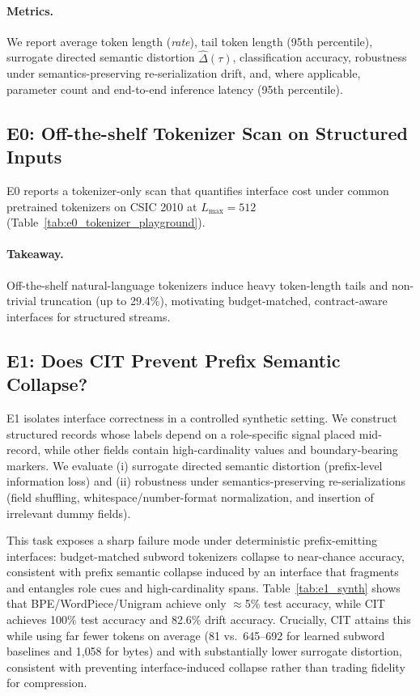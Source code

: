 \paragraph{Metrics.}
We report average token length (\emph{rate}), tail token length (95th percentile),
surrogate directed semantic distortion $\widehat{\Delta}(\tau)$,
classification accuracy, robustness under semantics-preserving re-serialization drift,
and, where applicable, parameter count and end-to-end inference latency (95th percentile).

\subsection{E0: Off-the-shelf Tokenizer Scan on Structured Inputs}
\label{sec:exp_e0}

E0 reports a tokenizer-only scan that quantifies interface cost under common pretrained tokenizers on CSIC 2010 at $L_{\max}{=}512$ (Table~\ref{tab:e0_tokenizer_playground}).
\paragraph{Takeaway.}
Off-the-shelf natural-language tokenizers induce heavy token-length tails and non-trivial truncation (up to 29.4\%), motivating budget-matched, contract-aware interfaces for structured streams.


\subsection{E1: Does CIT Prevent Prefix Semantic Collapse?}
\label{sec:exp_e1}

E1 isolates interface correctness in a controlled synthetic setting.
We construct structured records whose labels depend on a role-specific signal placed mid-record, while other fields contain high-cardinality values and boundary-bearing markers.
We evaluate (i) surrogate directed semantic distortion (prefix-level information loss) and (ii) robustness under semantics-preserving re-serializations (field shuffling, whitespace/number-format normalization, and insertion of irrelevant dummy fields).

This task exposes a sharp failure mode under deterministic prefix-emitting interfaces: budget-matched subword tokenizers collapse to near-chance accuracy, consistent with prefix semantic collapse induced by an interface that fragments and entangles role cues and high-cardinality spans.
Table~\ref{tab:e1_synth} shows that BPE/WordPiece/Unigram achieve only $\approx$5\% test accuracy, while CIT achieves 100\% test accuracy and 82.6\% drift accuracy.
Crucially, CIT attains this while using far fewer tokens on average (81 vs.\ 645--692 for learned subword baselines and 1{,}058 for bytes) and with substantially lower surrogate distortion, consistent with preventing interface-induced collapse rather than trading fidelity for compression.


